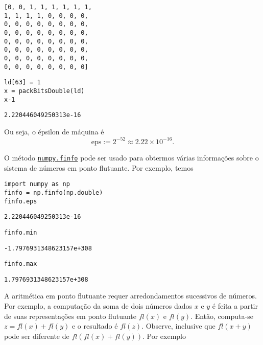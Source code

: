 \begin{verbatim}
[0, 0, 1, 1, 1, 1, 1, 1,
1, 1, 1, 1, 0, 0, 0, 0,
0, 0, 0, 0, 0, 0, 0, 0,
0, 0, 0, 0, 0, 0, 0, 0,
0, 0, 0, 0, 0, 0, 0, 0,
0, 0, 0, 0, 0, 0, 0, 0,
0, 0, 0, 0, 0, 0, 0, 0,
0, 0, 0, 0, 0, 0, 0, 0]
\end{verbatim}

\begin{lstlisting}
ld[63] = 1
x = packBitsDouble(ld)
x-1
\end{lstlisting}

\begin{verbatim}
2.220446049250313e-16
\end{verbatim}


Ou seja, o épsilon de máquina é
\begin{equation}
  \mathrm{eps} := 2^{-52} \approx 2.22\times 10^{-16}.
\end{equation}

\begin{obs}
  O método \href{https://numpy.org/doc/stable/reference/generated/numpy.finfo.html}{\lstinline{numpy.finfo}} pode ser usado para obtermos várias informações sobre o sistema de números em ponto flutuante. Por exemplo, temos

\begin{lstlisting}
import numpy as np
finfo = np.finfo(np.double)
finfo.eps
\end{lstlisting}

\begin{verbatim}
2.220446049250313e-16
\end{verbatim}

\begin{lstlisting}
finfo.min
\end{lstlisting}

\begin{verbatim}
-1.7976931348623157e+308
\end{verbatim}

\begin{lstlisting}
finfo.max
\end{lstlisting}

\begin{verbatim}
1.7976931348623157e+308
\end{verbatim}

\end{obs}

A aritmética em ponto flutuante requer arredondamentos sucessivos de números. Por exemplo, a computação da soma de dois números dados $x$ e $y$ é feita a partir de suas representações em ponto flutuante $fl(x)$ e $fl(y)$. Então, computa-se $z = fl(x)+fl(y)$ e o resultado é $fl(z)$. Observe, inclusive que $fl(x+y)$ pode ser diferente de $fl(fl(x)+fl(y))$. Por exemplo

